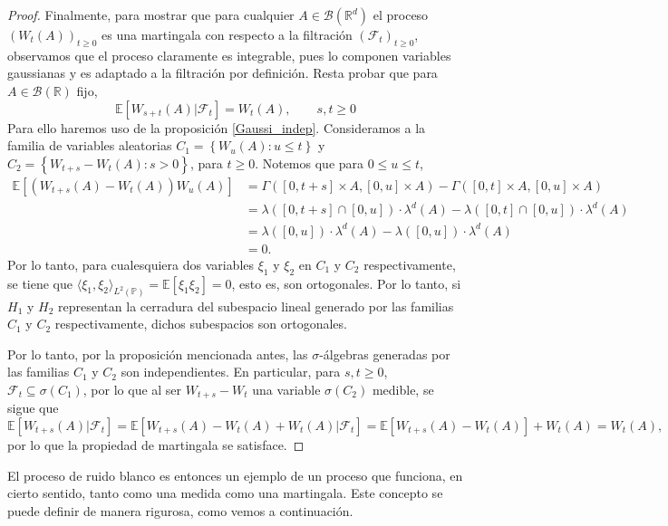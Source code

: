 \documentclass[letterpaper,twoside,12pt]{book}
\newcommand{\R}{\mathbb{R}}
\newcommand{\F}{\mathcal{F}}
\newcommand{\B}{\mathcal{B}}
\newcommand{\E}{\mathbb{E}}
\renewcommand{\P}{\mathbb{P}}
\newcommand{\1}{\mathds{1}}
\theoremstyle{definition}
\theoremstyle{definition}
\theoremstyle{remark}
\theoremstyle{definition}
\theoremstyle{definition}
\theoremstyle{definition}
\theoremstyle{definition}
\theoremstyle{definition}
\begin{document}
\begin{proof}
 Finalmente, para mostrar que para cualquier $A\in \B(\R^{d})$ el proceso $(W_t(A))_{t\geq0}$ es una martingala con respecto a la filtración $(\F_t)_{t\geq0}$, observamos que el proceso claramente es integrable, pues lo componen variables gaussianas y es adaptado a la filtración por definición. Resta probar que para $A\in \B(\R)$ fijo,
 \[
 \E\left[W_{s+t}(A)\lvert \F_t\right]=W_t(A), \qquad s,t\geq0  
 \]
 Para ello haremos uso de la proposición \ref{Gaussi_indep}. Consideramos a la familia de variables aleatorias $C_1=\left\{W_u(A):u\leq t\right\}$ y
 $C_2=\left\{W_{t+s}-W_t(A):s>0 \right\}$, para $t\geq0$. Notemos que para $0\le u\le t$,
 \begin{align*}
   \E\left[(W_{t+s}(A)-W_t(A))W_u(A)\right]&=\Gamma([0,t+s]\times A, [0,u]\times A)-\Gamma([0,t]\times A,[0,u]\times A)\\
   &=\lambda([0,t+s]\cap[0,u])\cdot\lambda^{d}(A)-\lambda([0,t]\cap[0,u])\cdot\lambda^{d}(A)\\
   &=\lambda([0,u])\cdot\lambda^{d}(A)-\lambda([0,u])\cdot\lambda^{d}(A)\\
   &=0.
 \end{align*}
 Por lo tanto, para cualesquiera dos variables $\xi_1$ y $\xi_2$ en $C_1$ y $C_2$ respectivamente, se tiene que $\langle \xi_1,\xi_2\rangle_{L^2(\P)}= \E\left[\xi_1\xi_2\right]=0$, esto es, son ortogonales. Por lo tanto, si $H_1$ y $H_2$ representan la cerradura del subespacio lineal generado por las familias $C_1$ y $C_2$ respectivamente, dichos subespacios son ortogonales.
 
 Por lo tanto, por la proposición mencionada antes, las $\sigma$-álgebras generadas por las familias $C_1$ y $C_2$ son independientes. En particular, para $s,t\geq0$, $\F_t\subseteq \sigma(C_1)$, por lo que al ser $W_{t+s}-W_t$ una variable $\sigma(C_2)$ medible, se sigue que 
 \[
     \E\left[W_{t+s}(A)|\F_t\right]=\E\left[W_{t+s}(A)-W_{t}(A)+W_t(A)|\F_t\right]=\E\left[W_{t+s}(A)-W_t(A)\right]+W_t(A)=W_t(A),
     \]
     por lo que la propiedad de martingala se satisface.  
\end{proof}

El proceso de ruido blanco es entonces un ejemplo de un proceso que funciona, en cierto sentido, tanto como una medida como una martingala. Este concepto se puede definir de manera rigurosa, como vemos a continuación.
\end{document}
